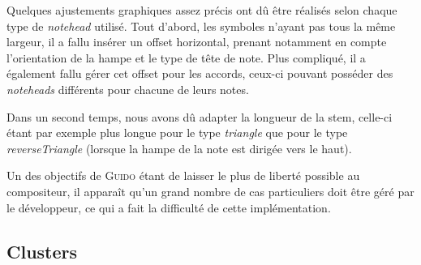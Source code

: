\documentclass{article}
\begin{document}
Quelques ajustements graphiques assez précis ont dû être réalisés selon chaque type de \emph{notehead} utilisé. Tout d'abord, les symboles n'ayant pas tous la même largeur, il a fallu insérer un offset horizontal, prenant notamment en compte l'orientation de la hampe et le type de tête de note. Plus compliqué, il a également fallu gérer cet offset pour les accords, ceux-ci pouvant posséder des \emph{noteheads} différents pour chacune de leurs notes.

Dans un second temps, nous avons dû adapter la longueur de la stem, celle-ci étant par exemple plus longue pour le type \emph{triangle} que pour le type \emph{reverseTriangle} (lorsque la hampe de la note est dirigée vers le haut).

Un des objectifs de \textsc{Guido} étant de laisser le plus de liberté possible au compositeur, il apparaît qu'un grand nombre de cas particuliers doit être géré par le développeur, ce qui a fait la difficulté de cette implémentation.

\subsection{Clusters}\label{subsec:clusters}
\end{document}
